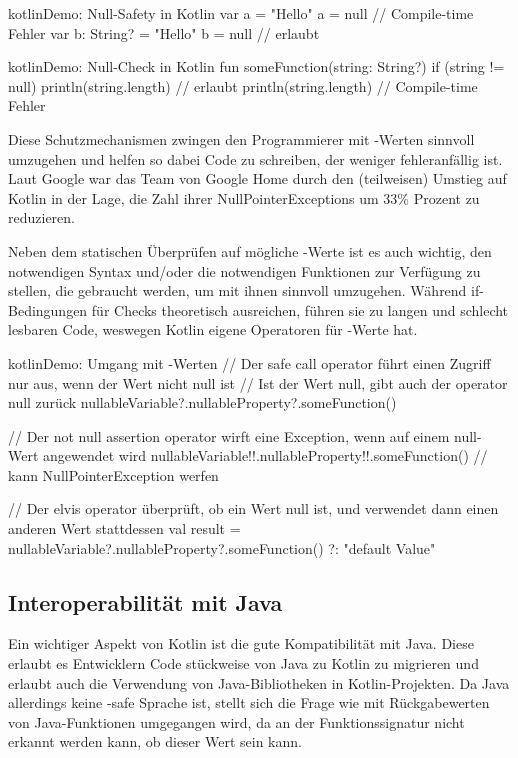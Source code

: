 \begin{codeBlock}{kotlin}{Demo: Null-Safety in Kotlin}
var a = "Hello"
a = null // Compile-time Fehler
var b: String? = "Hello"
b = null // erlaubt
\end{codeBlock}

\begin{codeBlock}{kotlin}{Demo: Null-Check in Kotlin}
    fun someFunction(string: String?) {
        if (string != null) println(string.length) // erlaubt
        println(string.length) // Compile-time Fehler
    }
\end{codeBlock}

Diese Schutzmechanismen zwingen den Programmierer mit -Werten sinnvoll umzugehen und helfen so dabei
Code zu schreiben, der weniger fehleranfällig ist.
Laut Google war das Team von Google Home durch den (teilweisen) Umstieg auf Kotlin in der Lage, die Zahl ihrer
NullPointerExceptions um 33\% Prozent zu reduzieren.\cite{androidDevGoogleHome}

Neben dem statischen Überprüfen auf mögliche -Werte ist es auch wichtig, den notwendigen
Syntax und/oder die notwendigen Funktionen zur Verfügung zu stellen, die gebraucht werden, um mit ihnen sinnvoll
umzugehen.
Während if-Bedingungen für  Checks theoretisch ausreichen, führen sie zu langen und schlecht lesbaren
Code, weswegen Kotlin eigene Operatoren für -Werte hat.\cite{kdocNullSafety}

\begin{codeBlock}{kotlin}{Demo: Umgang mit -Werten}
// Der safe call operator führt einen Zugriff nur aus, wenn der Wert nicht null ist
// Ist der Wert null, gibt auch der operator null zurück
nullableVariable?.nullableProperty?.someFunction()

// Der not null assertion operator wirft eine Exception, wenn auf einem null-Wert angewendet wird
nullableVariable!!.nullableProperty!!.someFunction() // kann NullPointerException werfen

// Der elvis operator überprüft, ob ein Wert null ist, und verwendet dann einen anderen Wert stattdessen
val result = nullableVariable?.nullableProperty?.someFunction() ?: "default Value"
\end{codeBlock}

\subsection{Interoperabilität mit Java}
Ein wichtiger Aspekt von Kotlin ist die gute Kompatibilität mit Java.
Diese erlaubt es Entwicklern Code stückweise von Java zu Kotlin zu migrieren und erlaubt auch die Verwendung von
Java-Bibliotheken in Kotlin-Projekten.
Da Java allerdings keine -safe Sprache ist, stellt sich die Frage wie mit Rückgabewerten von
Java-Funktionen umgegangen wird, da an der Funktionssignatur nicht erkannt werden kann, ob dieser Wert
 sein kann.

